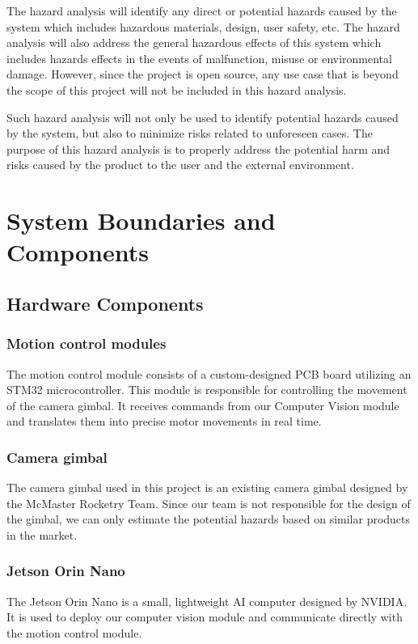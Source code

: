 \documentclass{article}
\begin{document}
The hazard analysis will identify any direct or potential hazards caused by the
system which includes hazardous materials, design, user safety, etc. The hazard
analysis will also address the general hazardous effects of this system which
includes hazards effects in the events of malfunction, misuse or environmental
damage. However, since the project is open source, any use case that is beyond
the scope of this project will not be included in this hazard analysis.

Such hazard analysis will not only be used to identify potential hazards caused
by the system, but also to minimize risks related to unforeseen cases. The
purpose of this hazard analysis is to properly address the potential harm and
risks caused by the product to the user and the external environment.

\section{System Boundaries and Components}

\subsection{Hardware Components}
\subsubsection{Motion control modules}
The motion control module consists of a custom-designed PCB board utilizing an
STM32 microcontroller. This module is responsible for controlling the movement
of the camera gimbal. It receives commands from our Computer Vision module and
translates them into precise motor movements in real time.
\subsubsection{Camera gimbal}
The camera gimbal used in this project is an existing camera gimbal designed by
the McMaster Rocketry Team. Since our team is not responsible for the design of
the gimbal, we can only estimate the potential hazards based on similar
products in the market.
\subsubsection{Jetson Orin Nano}
The Jetson Orin Nano is a small, lightweight AI computer designed by NVIDIA. It
is used to deploy our computer vision module and communicate directly with the
motion control module.
\end{document}
